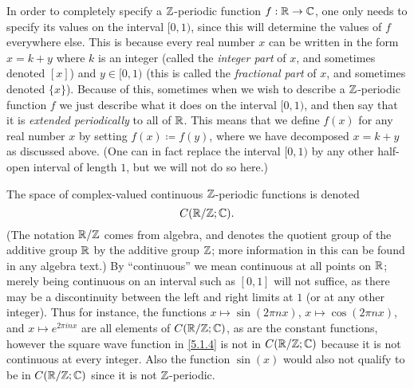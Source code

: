\begin{note}
  In order to completely specify a \(\mathbb{Z}\)-periodic function \(f : \mathbb{R} \to \mathbb{C}\), one only needs to specify its values on the interval \([0, 1)\), since this will determine the values of \(f\) everywhere else.
  This is because every real number \(x\) can be written in the form \(x = k + y\) where \(k\) is an integer (called the \emph{integer part} of \(x\), and sometimes denoted \([x]\)) and \(y \in [0, 1)\) (this is called the \emph{fractional part} of \(x\), and sometimes denoted \(\{x\}\)).
  Because of this, sometimes when we wish to describe a \(\mathbb{Z}\)-periodic function \(f\) we just describe what it does on the interval \([0, 1)\), and then say that it is \emph{extended periodically} to all of \(\mathbb{R}\).
  This means that we define \(f(x)\) for any real number \(x\) by setting \(f(x) \coloneqq f(y)\), where we have decomposed \(x = k + y\) as discussed above.
  (One can in fact replace the interval \([0, 1)\) by any other half-open interval of length \(1\), but we will not do so here.)
\end{note}

\begin{note}
  The space of complex-valued continuous \(\mathbb{Z}\)-periodic functions is denoted
  \[
    C(\mathbb{R} / \mathbb{Z} ; \mathbb{C}).
  \]
  (The notation \(\mathbb{R} / \mathbb{Z}\) comes from algebra, and denotes the quotient group of the additive group \(\mathbb{R}\) by the additive group \(\mathbb{Z}\);
  more information in this can be found in any algebra text.)
  By ``continuous'' we mean continuous at all points on \(\mathbb{R}\);
  merely being continuous on an interval such as \([0, 1]\) will not suffice, as there may be a discontinuity between the left and right limits at \(1\) (or at any other integer).
  Thus for instance, the functions \(x \mapsto \sin(2 \pi n x)\), \(x \mapsto \cos(2 \pi n x)\), and \(x \mapsto e^{2 \pi i n x}\) are all elements of \(C(\mathbb{R} / \mathbb{Z} ; \mathbb{C})\), as are the constant functions, however the square wave function in \cref{5.1.4} is not in \(C(\mathbb{R} / \mathbb{Z} ; \mathbb{C})\) because it is not continuous at every integer.
  Also the function \(\sin(x)\) would also not qualify to be in \(C(\mathbb{R} / \mathbb{Z} ; \mathbb{C})\) since it is not \(\mathbb{Z}\)-periodic.
\end{note}

